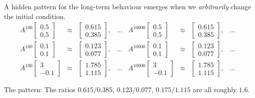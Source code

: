 \documentclass[../main.tex]{subfiles}
\begin{document}
A hidden pattern for the long-term behaviour emerges when we \emph{arbitrarily} change the initial condition.
\[
  \begin{array}{rclcrclc}
    A^{100} \begin{bmatrix} 0.5 \\ 0.5 \end{bmatrix} &\approx& \begin{bmatrix} 0.615 \\ 0.385 \end{bmatrix}, &\dots&
    A^{10000} \begin{bmatrix} 0.5 \\ 0.5 \end{bmatrix} &\approx& \begin{bmatrix} 0.615 \\ 0.385 \end{bmatrix}, &\dots \\[2ex]
    A^{100} \begin{bmatrix} 0.1 \\ 0.1 \end{bmatrix} &\approx& \begin{bmatrix} 0.123 \\ 0.077 \end{bmatrix}, &\dots&
    A^{10000} \begin{bmatrix} 0.1 \\ 0.1 \end{bmatrix} &\approx& \begin{bmatrix} 0.123 \\ 0.077 \end{bmatrix}, &\dots \\[2ex]
    A^{100} \begin{bmatrix} 3 \\ -0.1 \end{bmatrix} &\approx& \begin{bmatrix} 1.785 \\ 1.115 \end{bmatrix}, &\dots&
    A^{10000} \begin{bmatrix} 3 \\ -0.1 \end{bmatrix} &\approx& \begin{bmatrix} 1.785 \\ 1.115 \end{bmatrix}, &\dots
  \end{array}
\]

The pattern: The ratios \(0.615 / 0.385\), \(0.123 / 0.077\), \(0.175 / 1.115\) are all roughly \(1.6\).
\end{document}
